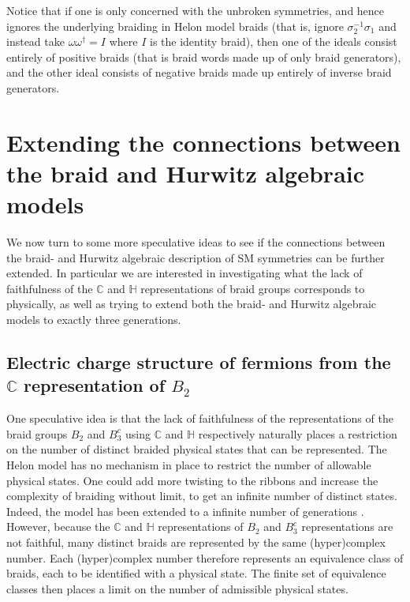 \documentclass[a4paper]{jpconf}
\begin{document}
Notice that if one is only concerned with the unbroken symmetries, and hence ignores the underlying braiding in Helon model braids (that is, ignore $\sigma_2^{-1}\sigma_1$ and instead take $\omega\omega^{\dagger}=I$ where $I$ is the identity braid), then one of the ideals consist entirely of positive braids (that is braid words made up of only braid generators), and the other ideal consists of negative braids made up entirely of inverse braid generators. 

\section{Extending the connections between the braid and Hurwitz algebraic models}
We now turn to some more speculative ideas to see if the connections between the braid- and Hurwitz algebraic description of SM symmetries can be further extended. In particular we are interested in investigating what the lack of faithfulness of the $\mathbb{C}$ and $\mathbb{H}$ representations of braid groups corresponds to physically, as well as trying to extend both the braid- and Hurwitz algebraic models to exactly three generations.

\subsection{Electric charge structure of fermions from the $\mathbb{C}$ representation of $B_2$}

One speculative idea is that the lack of faithfulness of the representations of the braid groups $B_2$ and $B_3^c$ using $\mathbb{C}$ and $\mathbb{H}$ respectively naturally places a restriction on the number of distinct braided physical states that can be represented. The Helon model has no mechanism in place to restrict the number of allowable physical states. One could add more twisting to the ribbons and increase the complexity of braiding without limit, to get an infinite number of distinct states. Indeed, the model has been extended to a infinite number of generations \cite{Bilson-Thompson2008}. However, because the $\mathbb{C}$ and $\mathbb{H}$ representations of $B_2$ and $B_3^c$ representations are not faithful, many distinct braids are represented by the same (hyper)complex number. Each (hyper)complex number therefore represents an equivalence class of braids, each to be identified with a physical state. The finite set of equivalence classes then places a limit on the number of admissible physical states.
\end{document}
